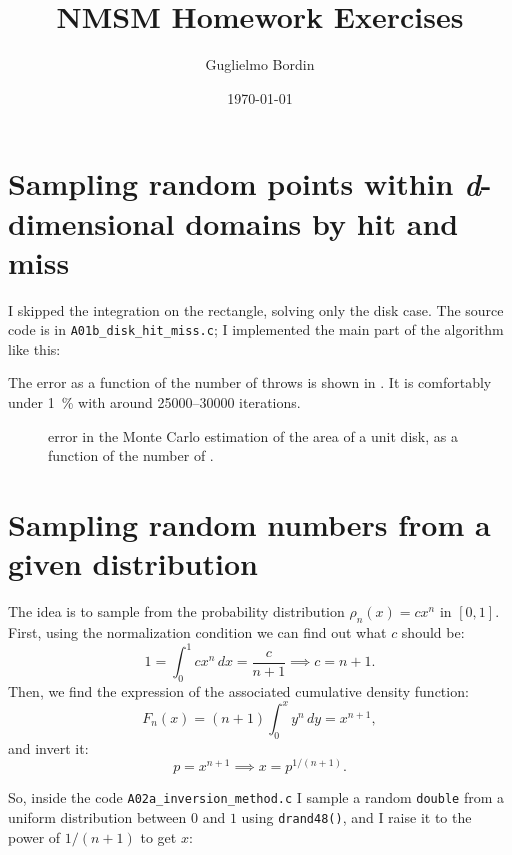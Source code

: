 \documentclass{gulartcl}
\title{NMSM Homework Exercises}
\author{Guglielmo Bordin}
\date{\today}
\begin{document}
\maketitle
\section{Sampling random points within \emph{d}-dimensional domains by hit and
miss}
I skipped the integration on the rectangle, solving only the disk case.  The
source code is in \texttt{A01b\_disk\_hit\_miss.c}; I implemented the main part
of the algorithm like this:



The error as a function of the number of throws is shown in .
It is comfortably under \qty{1}{\percent} with around \numrange{25000}{30000}
iterations.

\begin{figure}
    \centering
    
    \caption{error in the Monte Carlo estimation of the area of a unit
        disk, as a function of the number of .}
    \label{fig:A01b}
\end{figure}

\section{Sampling random numbers from a given distribution}
The idea is to sample from the probability distribution $\rho_n(x) = c x^n$ in
$[0, 1]$.  First, using the normalization condition we can find out what $c$
should be:
\begin{equation}
    1 = \int_{0}^{1} cx^n \, dx = \frac{c}{n + 1} \implies c = n + 1.
\end{equation}
Then, we find the expression of the associated cumulative density function:
\begin{equation}
    F_n(x) = (n + 1) \int_{0}^{x} y^n \, dy = x^{n + 1},
\end{equation}
and invert it:
\begin{equation}
    p = x^{n + 1} \implies x = p^{1 / (n + 1)}.
\end{equation}

So, inside the code \texttt{A02a\_inversion\_method.c} I sample a random
\texttt{double} from a uniform distribution between $0$ and $1$ using
\texttt{drand48()}, and I raise it to the power of $1 / (n + 1)$ to get $x$:
\end{document}
